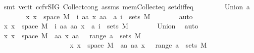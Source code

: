 \begin{isabellebody}
\ {\isacharparenleft}{\kern0pt}smt\ {\isacharparenleft}{\kern0pt}verit{\isacharcomma}{\kern0pt}\ ccfv{\isacharunderscore}{\kern0pt}SIG{\isacharparenright}{\kern0pt}\ Collect{\isacharunderscore}{\kern0pt}cong\ assms{\isacharparenleft}{\kern0pt}{}{\isacharparenright}{\kern0pt}\ mem{\isacharunderscore}{\kern0pt}Collect{\isacharunderscore}{\kern0pt}eq\ set{\isacharunderscore}{\kern0pt}diff{\isacharunderscore}{\kern0pt}eq{\isacharparenright}{\kern0pt}{\isacharplus}{\kern0pt}\isanewline
\ \ \isamarkupfalse%
\isanewline
\ \ \ \ \isamarkupfalse%
\ {\isacharparenleft}{\kern0pt}Union\ a{\isacharparenright}{\kern0pt}\isanewline
\ \ \ \ \isamarkupfalse%
\ \isamarkupfalse%
\ {\isachardoublequoteopen}{\isasymAnd}x{\isachardot}{\kern0pt}\ x\ {\isasymin}\ space\ M{}\ {\isasymLongrightarrow}\ {\isacharparenleft}{\kern0pt}{\isasymUnion}i{\isachardot}{\kern0pt}\ {\isacharbraceleft}{\kern0pt}aa{\isachardot}{\kern0pt}\ {\isacharparenleft}{\kern0pt}x{\isacharcomma}{\kern0pt}\ aa{\isacharparenright}{\kern0pt}\ {\isasymin}\ a\ i{\isacharbraceright}{\kern0pt}{\isacharparenright}{\kern0pt}\ {\isasymin}\ sets\ M{}{\isachardoublequoteclose}\isanewline
\ \ \ \ \ \ \isamarkupfalse%
\ auto\isanewline
\ \ \ \ \isamarkupfalse%
\ \isamarkupfalse%
\ {\isachardoublequoteopen}{\isasymAnd}x{\isachardot}{\kern0pt}\ x\ {\isasymin}\ space\ M{}\ {\isasymLongrightarrow}\ {\isacharparenleft}{\kern0pt}{\isasymUnion}i{\isachardot}{\kern0pt}\ {\isacharbraceleft}{\kern0pt}aa{\isachardot}{\kern0pt}\ {\isacharparenleft}{\kern0pt}aa{\isacharcomma}{\kern0pt}\ x{\isacharparenright}{\kern0pt}\ {\isasymin}\ a\ i{\isacharbraceright}{\kern0pt}{\isacharparenright}{\kern0pt}\ {\isasymin}\ sets\ M{}{\isachardoublequoteclose}\isanewline
\ \ \ \ \ \ \isamarkupfalse%
\ Union\ \isamarkupfalse%
\ auto\isanewline
\ \ \ \ \isamarkupfalse%
\ \isamarkupfalse%
\ {\isachardoublequoteopen}{\isasymAnd}x{\isachardot}{\kern0pt}\ x\ {\isasymin}\ space\ M{}\ {\isasymLongrightarrow}\ {\isacharbraceleft}{\kern0pt}aa{\isachardot}{\kern0pt}\ {\isacharparenleft}{\kern0pt}x{\isacharcomma}{\kern0pt}\ aa{\isacharparenright}{\kern0pt}\ {\isasymin}\ {\isasymUnion}\ {\isacharparenleft}{\kern0pt}range\ a{\isacharparenright}{\kern0pt}{\isacharbraceright}{\kern0pt}\ {\isasymin}\ sets\ M{}{\isachardoublequoteclose}\isanewline
\ \ \ \ \ \ \ \ \ \ \ \ \ \ \ \ \ \ \ \ {\isachardoublequoteopen}{\isasymAnd}x{\isachardot}{\kern0pt}\ x\ {\isasymin}\ space\ M{}\ {\isasymLongrightarrow}\ {\isacharbraceleft}{\kern0pt}aa{\isachardot}{\kern0pt}\ {\isacharparenleft}{\kern0pt}aa{\isacharcomma}{\kern0pt}\ x{\isacharparenright}{\kern0pt}\ {\isasymin}\ {\isasymUnion}\ {\isacharparenleft}{\kern0pt}range\ a{\isacharparenright}{\kern0pt}{\isacharbraceright}{\kern0pt}\ {\isasymin}\ sets\ M{}{\isachardoublequoteclose}\isanewline

\end{isabellebody}
